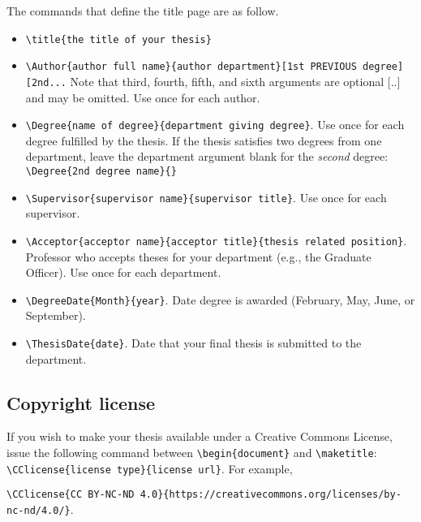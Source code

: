 \documentclass[11pt]{article}
\begin{document}
The commands that define the title page are as follow.
\begin{itemize}
\item \verb|\title{the title of your thesis}|

\item \verb|\Author{author full name}{author department}[1st PREVIOUS degree][2nd...| \linebreak
Note that third, fourth, fifth, and sixth arguments are optional [..] and may be omitted.  Use once for each author.

\item \verb|\Degree{name of degree}{department giving degree}|. Use once for each degree fulfilled by the thesis. If the thesis satisfies two degrees from one department, leave the department argument blank for the \textit{second} degree: \verb|\Degree{2nd degree name}{}|

\item \verb|\Supervisor{supervisor name}{supervisor title}|. Use once for each supervisor.

\item \verb|\Acceptor{acceptor name}{acceptor title}{thesis related position}|. Professor who accepts theses for your department (e.g., the Graduate Officer). Use once for each department. 

\item \verb|\DegreeDate{Month}{year}|. Date degree is awarded (February, May, June, or September).  

\item \verb|\ThesisDate{date}|. Date that your final thesis is submitted to the department.
\end{itemize}

\subsection*{Copyright license}
If you wish to make your thesis available under a Creative Commons License, issue the following command between
\verb|\begin{document}| and \verb|\maketitle|: \verb|\CClicense{license type}{license url}|.  For example,
 
\vskip 5pt
\noindent\quad\verb|\CClicense{CC BY-NC-ND 4.0}{https://creativecommons.org/licenses/by-nc-nd/4.0/}|.
\end{document}
